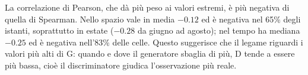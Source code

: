 La correlazione di Pearson, che dà più peso ai valori estremi, è più negativa di quella di Spearman. Nello spazio vale in media $-0.12$ ed è negativa nel 65\% degli istanti, soprattutto in estate ($-0.28$ da giugno ad agosto); nel tempo ha mediana $-0.25$ ed è negativa nell'83\% delle celle. Questo suggerisce che il legame riguardi i valori più alti di G: quando e dove il generatore sbaglia di più, D tende a essere più bassa, cioè il discriminatore giudica l'osservazione più reale.

